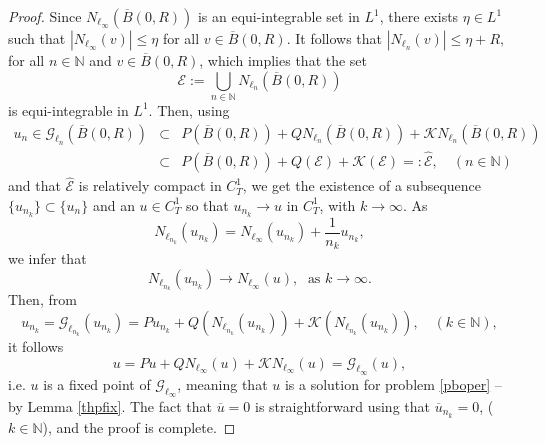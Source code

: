 \documentclass[11pt]{amsart}
\numberwithin{equation}{section} \textwidth=15.5cm
\begin{document}
\begin{proof}
Since $N_{\ell_\infty}(\overline{B}(0,R))$ is an equi-integrable set in $L^1$, there exists $\eta\in L^1$ such that $\left|N_{\ell_\infty}(v)\right|\leq\eta$ for all $v\in \overline{B}(0,R)$. It follows that $\left|N_{\ell_n}(v)\right|\leq\eta+R,$ for all $n\in\mathbb{N}$ and $v\in \overline{B}(0,R)$, which implies that the set
$$\mathcal{E}:=\bigcup_{n\in\mathbb{N}}N_{\ell_n}(\overline{B}(0,R))$$
is equi-integrable in $L^1$. Then, using
\begin{eqnarray*}
u_n \in \mathcal{G}_{\ell_n}(\overline{B}(0,R)) &\subset& P(\overline{B}(0,R))+ Q N_{\ell_n}(\overline{B}(0,R)) +\mathcal{K}N_{\ell_n}(\overline{B}(0,R))\\
&\subset& P(\overline{B}(0,R))+Q(\mathcal{E})+\mathcal{K}(\mathcal{E})=:\widehat{\mathcal{E}}, \quad (n\in \mathbb{N})
\end{eqnarray*}
and that $\widehat{\mathcal{E}}$ is relatively compact in $C^1_T$, we get the existence of a subsequence $\{u_{n_k}\}\subset\{u_n\}$ and an $u\in C_T^1$ so that $u_{n_k}\to u$ in $C_T^1$, with $k\to\infty$.
As
$$N_{\ell_{n_k}}(u_{n_k})=N_{\ell_\infty}(u_{n_k})+\frac{1}{n_k}u_{n_k},$$
we infer that
$$N_{\ell_{n_k}}(u_{n_k}) \to N_{\ell_\infty}(u), \; \mbox{ as } k \to \infty.$$
Then, from
$$u_{n_k}=\mathcal{G}_{\ell_{n_k}}(u_{n_k})=Pu_{n_k}+Q\left(N_{\ell_{n_k}}(u_{n_k})\right)+\mathcal{K}\left(N_{\ell_{n_k}}(u_{n_k})\right), \quad (k\in \mathbb{N}),$$
it follows
$$u=Pu+QN_{\ell_\infty}(u)+\mathcal{K}N_{\ell_\infty}(u)=\mathcal{G}_{\ell_\infty}(u),$$
i.e. $u$ is a fixed point of $\mathcal{G}_{\ell_\infty}$, meaning that  $u$ is a solution for problem \eqref{pboper} -- by Lemma \ref{thpfix}. The fact that $\overline{u}=0$ is straightforward using that $\overline{u}_{n_k}=0$, ($k\in \mathbb{N}$),  and the proof is complete.
\end{proof}
\end{document}
